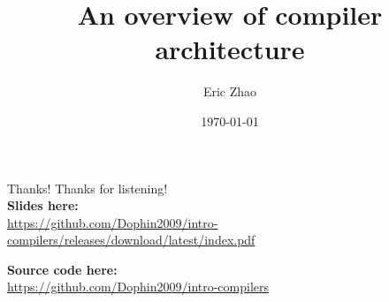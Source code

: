 \documentclass[xcolor={dvipsnames},xtable]{beamer}
\title{An overview of compiler architecture}
\subtitle{}
\date{\today}
\author{Eric Zhao}
\begin{document}

\newcommand{\sectiontitle}{}
\newcommand{\currenttitle}{}

\maketitle

\newcommand{\subdir}{sections}
\newcommand{\codedir}{listings}




\begin{frame}{Thanks!}
  Thanks for listening! \\[2em]

  \textbf{Slides here:} \\
  {\scriptsize \url{https://github.com/Dophin2009/intro-compilers/releases/download/latest/index.pdf}}
  
  \textbf{Source code here:} \\
  {\scriptsize \url{https://github.com/Dophin2009/intro-compilers}}
    
\end{frame}
\end{document}

